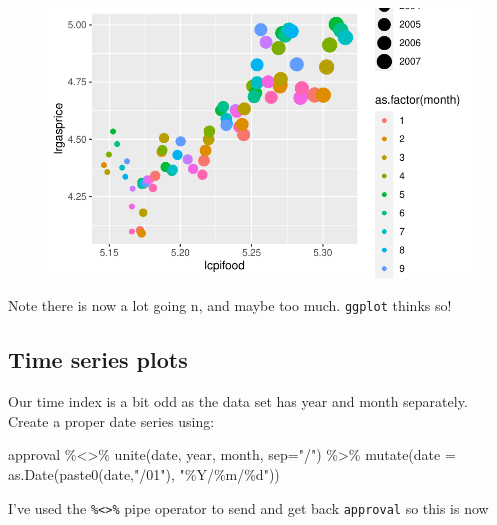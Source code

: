 \documentclass[
  letterpaper,
]{book}
\newenvironment{Shaded}{\begin{snugshade}}{\end{snugshade}}
\newcommand{\AttributeTok}[1]{\textcolor[rgb]{0.40,0.45,0.13}{#1}}
\newcommand{\FunctionTok}[1]{\textcolor[rgb]{0.28,0.35,0.67}{#1}}
\newcommand{\NormalTok}[1]{\textcolor[rgb]{0.00,0.23,0.31}{#1}}
\newcommand{\SpecialCharTok}[1]{\textcolor[rgb]{0.37,0.37,0.37}{#1}}
\newcommand{\StringTok}[1]{\textcolor[rgb]{0.13,0.47,0.30}{#1}}
\begin{document}
\begin{figure}[H]

{\centering \includegraphics{Appendix1_files/figure-pdf/p3-1.pdf}

}

\end{figure}

Note there is now a lot going n, and maybe too much. \texttt{ggplot}
thinks so!

\hypertarget{time-series-plots}{%
\subsection{Time series plots}\label{time-series-plots}}

Our time index is a bit odd as the data set has year and month
separately. Create a proper date series using:

\begin{Shaded}
\begin{Highlighting}[]
\NormalTok{approval }\SpecialCharTok{\%\textless{}\textgreater{}\%} 
  \FunctionTok{unite}\NormalTok{(date, year, month, }\AttributeTok{sep=}\StringTok{"/"}\NormalTok{) }\SpecialCharTok{\%\textgreater{}\%} 
  \FunctionTok{mutate}\NormalTok{(}\AttributeTok{date =} \FunctionTok{as.Date}\NormalTok{(}\FunctionTok{paste0}\NormalTok{(date,}\StringTok{"/01"}\NormalTok{), }\StringTok{"\%Y/\%m/\%d"}\NormalTok{))}
\end{Highlighting}
\end{Shaded}

I've used the \texttt{\%\textless{}\textgreater{}\%} pipe operator to
send and get back \texttt{approval} so this is now
\end{document}
